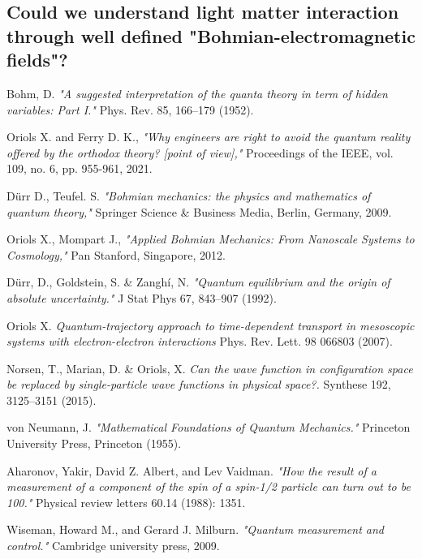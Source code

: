 \documentclass[11pt, a4paper]{article} %
\begin{document}
\subsection*{Could we understand light matter interaction through well defined "Bohmian-electromagnetic fields"?}




\newpage
\begin{thebibliography}{1}
{\footnotesize 

Bohm, D. {\em "A suggested interpretation of the quanta theory in term of hidden variables: Part I."} Phys. Rev. 85, 166–179 (1952).

Oriols X. and Ferry D. K., {\em "Why engineers are right to avoid the quantum reality offered by the orthodox theory? [point of view],"} Proceedings of the IEEE, vol. 109, no. 6, pp. 955-961, 2021.

Dürr D., Teufel. S. {\em "Bohmian mechanics: the physics and mathematics of quantum theory,"} Springer Science \& Business Media, Berlin, Germany, 2009.

	Oriols X., Mompart J., {\em "Applied Bohmian Mechanics: From Nanoscale Systems to Cosmology,"} Pan Stanford, Singapore, 2012.
	
Dürr, D., Goldstein, S. \& Zanghí, N. {\em "Quantum equilibrium and the origin of absolute uncertainty."} J Stat Phys 67, 843–907 (1992).

Oriols X. {\em Quantum-trajectory approach to time-dependent transport in mesoscopic systems with electron-electron interactions} Phys. Rev. Lett. 98 066803 (2007).

Norsen, T., Marian, D. \& Oriols, X. {\em Can the wave function in configuration space be replaced by single-particle wave functions in physical space?.} Synthese 192, 3125–3151 (2015).


von Neumann, J. {\em "Mathematical Foundations of Quantum Mechanics."} Princeton University Press, Princeton (1955).

Aharonov, Yakir, David Z. Albert, and Lev Vaidman. {\em "How the result of a measurement of a component of the spin of a spin-1/2 particle can turn out to be 100."} Physical review letters 60.14 (1988): 1351.

Wiseman, Howard M., and Gerard J. Milburn. {\em "Quantum measurement and control."} Cambridge university press, 2009.

}
\end{thebibliography}
\end{document}
